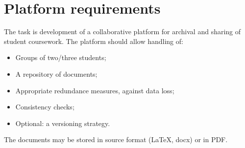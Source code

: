 \section{Platform requirements} \label{s:introduction:platform-requirements}
	The task is development of a collaborative platform for archival and sharing of student coursework. The platform should allow handling of:
	\begin{itemize}
		\item Groups of two/three students;
		\item A repository of documents;
		\item Appropriate redundance measures, against data loss;
		\item Consistency checks;
		\item Optional: a versioning strategy.
	\end{itemize}
	The documents may be stored in source format (\LaTeX, docx) or in PDF.